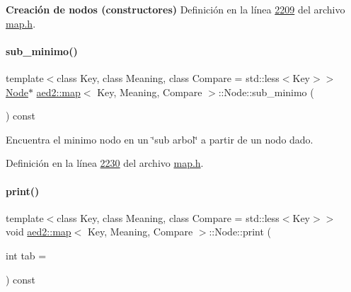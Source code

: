 \begin{Indent}{\bf \-Creación de nodos (constructores)}
Definición en la línea \hyperlink{map_8h_source_l02209}{2209} del archivo \hyperlink{map_8h_source}{map.\+h}.

\mbox{\label{structaed2_1_1map_1_1Node_a0457bc1ad6576f02057d9e9996cc3e5d_a0457bc1ad6576f02057d9e9996cc3e5d}} 
\paragraph{\texorpdfstring{sub\+\_\+minimo()}{sub\_minimo()}}
{\footnotesize\ttfamily template$<$class Key, class Meaning, class Compare = std\+::less$<$\+Key$>$$>$ \\
\hyperlink{structaed2_1_1map_1_1Node}{Node}$\ast$ \hyperlink{classaed2_1_1map}{aed2\+::map}$<$ Key, Meaning, Compare $>$\+::Node\+::sub\+\_\+minimo (\begin{DoxyParamCaption}{ }\end{DoxyParamCaption}) const\hspace{0.3cm}{\ttfamily [inline]}}

Encuentra el minimo nodo en un \char`\"{}sub arbol\char`\"{} a partir de un nodo dado. 

Definición en la línea \hyperlink{map_8h_source_l02230}{2230} del archivo \hyperlink{map_8h_source}{map.\+h}.

\mbox{\label{structaed2_1_1map_1_1Node_a26f1400bc53e5ac9a5b3ad6250a4f832_a26f1400bc53e5ac9a5b3ad6250a4f832}} 
\paragraph{\texorpdfstring{print()}{print()}}
{\footnotesize\ttfamily template$<$class Key, class Meaning, class Compare = std\+::less$<$\+Key$>$$>$ \\
void \hyperlink{classaed2_1_1map}{aed2\+::map}$<$ Key, Meaning, Compare $>$\+::Node\+::print (\begin{DoxyParamCaption}\item[{int}]{tab = {} }\end{DoxyParamCaption}) const\hspace{0.3cm}{\ttfamily [inline]}}




\end{Indent}
